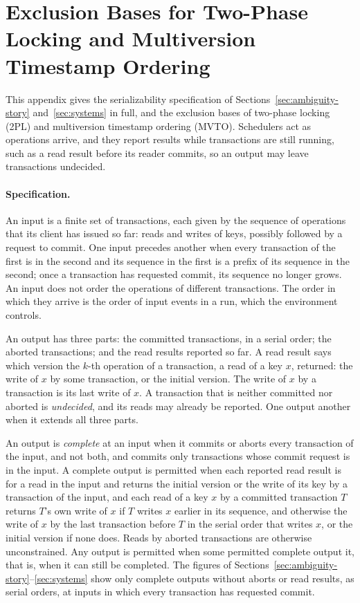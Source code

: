 \section{Exclusion Bases for Two-Phase Locking and Multiversion Timestamp Ordering}
\label{app:cc-bases}

This appendix gives the serializability specification of
Sections~\ref{sec:ambiguity-story} and~\ref{sec:systems} in full, and the
exclusion bases of two-phase locking (2PL) and multiversion timestamp ordering
(MVTO).  Schedulers act as operations arrive, and they report results while
transactions are still running, such as a read result before its reader
commits, so an output may leave transactions undecided.

\paragraph{Specification.}
An input is a finite set of transactions, each given by the sequence of
operations that its client has issued so far: reads and writes of keys,
possibly followed by a request to commit.  One input precedes another when
every transaction of the first is in the second and its sequence in the first
is a prefix of its sequence in the second; once a transaction has requested
commit, its sequence no longer grows.  An input does not order the operations
of different transactions.  The order in which they arrive is the order of
input events in a run, which the environment controls.

An output has three parts: the committed transactions, in a serial order; the
aborted transactions; and the read results reported so far.  A read result
says which version the $k$-th operation of a transaction, a read of a key $x$,
returned: the write of $x$ by some transaction, or the initial version.  The
write of $x$ by a transaction is its last write of $x$.  A transaction that is
neither committed nor aborted is \emph{undecided}, and its reads may already be
reported.  One output \outrel another when it extends all three parts.

An output is \emph{complete} at an input when it commits or aborts every
transaction of the input, and not both, and commits only transactions whose
commit request is in the input.  A complete output is permitted when each
reported read result is for a read in the input and returns the initial version
or the write of its key by a transaction of the input, and each read of a key
$x$ by a committed transaction $T$ returns $T$'s own write of $x$ if $T$ writes
$x$ earlier in its sequence, and otherwise the write of $x$ by the last
transaction before $T$ in the serial order that writes $x$, or the initial
version if none does.  Reads by aborted transactions are otherwise
unconstrained.  Any output is permitted when some permitted complete output
\outrel it, that is, when it can still be completed.  The figures of
Sections~\ref{sec:ambiguity-story}--\ref{sec:systems} show only complete
outputs without aborts or read results, as serial orders, at inputs in which
every transaction has requested commit.

